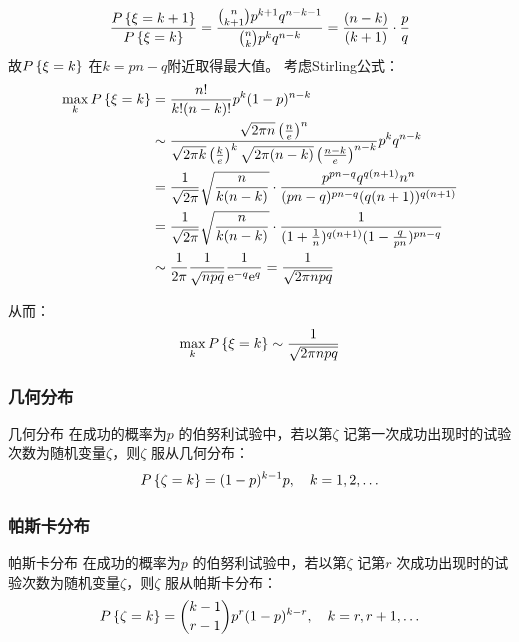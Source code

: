 \[
    \frac{\P{\xi=k+1}}{\P{\xi=k}} = \frac{\binom{n}{k+1} p^{k+1}
    q^{n-k-1}}{\binom{n}{k} p^{k} q^{n-k}} =
    \frac{(n-k)}{(k+1)} \cdot \frac{p}{q}
\]
故\(\P{\xi=k}\) 在\(k=pn-q\)附近取得最大值。
考虑Stirling公式：
\begin{align*}
    \max_{k} \P{\xi=k} &= \frac{n!}{k!(n-k)!} p^{k} (1-p)^{n-k} \\
    &\sim \frac{\sqrt{2\pi n} \left( \frac{n}{e} \right)^{n}}
    {\sqrt{2\pi k} \left( \frac{k}{e} \right)^{k}
    \sqrt{2\pi (n-k)} \left( \frac{n-k}{e} \right)^{n-k}} p^{k}q^{n-k}  \\
    &= \frac{1}{\sqrt{2\pi}} \sqrt{\frac{n}{k(n-k)}} \cdot
    \frac{p^{pn-q} q^{q(n+1)} n^{n} }{(pn-q)^{pn-q}(q(n+1))^{q(n+1)}} \\
    &= \frac{1}{\sqrt{2\pi}} \sqrt{\frac{n}{k(n-k)}} \cdot
    \frac{1}{(1+\frac{1}{n})^{q(n+1)}(1-\frac{q}{pn})^{pn-q}} \\
    &\sim \frac{1}{2\pi} \frac{1}{\sqrt{npq}} \frac{1}{\e^{-q} \e^{q}
    } = \frac{1}{\sqrt{2\pi npq}}
\end{align*}

从而：\[
    \max_{k} \P{\xi=k} \sim \frac{1}{\sqrt{2\pi npq}}
\]

\subsubsection{几何分布}

\begin{definition}{几何分布}
    在成功的概率为\(p\) 的伯努利试验中，若以第\(\zeta\)
    记第一次成功出现时的试验次数为随机变量\(\zeta\)，则\(\zeta\) 服从几何分布：
    \[
        \P{\zeta=k} = (1-p)^{k-1} p, \quad k=1,2,\ldots
    \]
\end{definition}


\subsubsection{帕斯卡分布}

\begin{definition}{帕斯卡分布}
    在成功的概率为\(p\) 的伯努利试验中，若以第\(\zeta\) 记第\(r\)
    次成功出现时的试验次数为随机变量\(\zeta\)，则\(\zeta\) 服从帕斯卡分布：
    \[
        \P{\zeta=k} = \binom{k-1}{r-1} p^r
        (1-p)^{k-r}, \quad k=r,r+1,\ldots
    \]
\end{definition}



